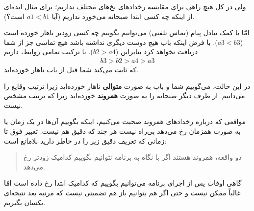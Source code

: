 \documentclass{book}
\begin{document}
    ولی در کل هیچ راهی برای مقایسه رخدادهای نخ‌های مختلف نداریم؛ برای مثال ایده‌ای از اینکه چه کسی ابتدا صبحانه می‌خورد نداریم 
    (آیا $a1 < b1$  است؟).
    
    امّا با کمک تبادل پیام (تماس تلفنی) می‌توانیم بگوییم چه کسی زودتر ناهار خورده است ($a3 < b3$).
    با فرض اینکه باب هیچ دوست دیگری نداشته باشد هیچ تماسی جز از شما دریافت نخواهد کرد بنابراین  ($b2 > a4$).
    با ترکیب تمامی روابط، داریم 
%
\begin{eqnarray*}
b3 > b2 > a4 > a3
\end{eqnarray*}
%
    که ثابت می‌کند شما قبل از باب ناهار خورده‌اید. 


    در این حالت، می‌گوییم شما و باب به صورت \textbf{متوالی} ناهار خورده‌اید زیرا 
    ترتیب وقایع را می‌دانیم. از طرف دیگر صبحانه را به صورت  \textbf{همروند} خورده‌اید 
    زیرا که ترتیب مشخص نیست. 
    
    مواقعی که درباره رخدادهای همروند صحبت می‌کنیم، اینکه بگوییم آن‌ها در یک زمان یا به صورت همزمان رخ می‌دهد بی‌راه نیست هر چند که دقیق هم نیست. 
    تعبیر فوق تا زمانی که تعریف دقیق زیر را در خاطر دارید بلامانع است:

\begin{quote}
    دو واقعه، همروند هستند اگر با نگاه به برنامه نتوانیم بگوییم کدامیک زودتر رخ می‌دهد. 
\end{quote}

    گاهی اوقات پس از اجرای برنامه می‌‌توانیم بگوییم که کدامیک ابتدا رخ داده است امّا غالباً ممکن نیست و حتی اگر هم بتوانیم 
    باز هم تضمینی نیست که مرتبه بعد نتیجه‌ای یکسان بگیریم. 
\newpage
\end{document}
